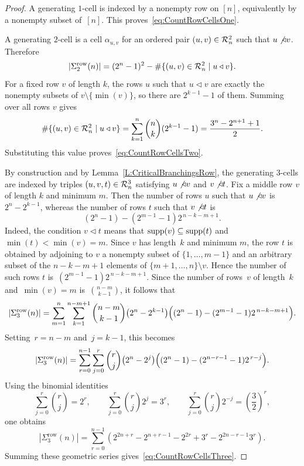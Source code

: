 \documentclass[a4paper, twoside, 11pt, english]{article}
\begin{document}
\begin{proof}
A generating $1$-cell is indexed by a nonempty row on $[n]$, equivalently by a nonempty
subset of~$[n]$. This proves~\eqref{eq:CountRowCellsOne}.

A generating $2$-cell is a cell $\alpha_{u,v}$ for an ordered pair $(u,v)\in \mathcal{R}_n^2$
such that $u\not\triangleleft v$. Therefore
\[
|\Sigma^{\mathrm{row}}_2(n)|
=
(2^n-1)^2-\#\{(u,v)\in \mathcal{R}_n^2\mid u\triangleleft v\}.
\]
For a fixed row $v$ of length $k$, the rows $u$ such that $u\triangleleft v$ are exactly
the nonempty subsets of $v\setminus\{\min(v)\}$, so there are $2^{k-1}-1$ of them.
Summing over all rows $v$ gives
\[
\#\{(u,v)\in \mathcal{R}_n^2\mid u\triangleleft v\}
=
\sum_{k=1}^n \binom{n}{k}(2^{k-1}-1)
=
\frac{3^n-2^{n+1}+1}{2}.
\]
Substituting this value proves~\eqref{eq:CountRowCellsTwo}.


By construction and by Lemma~\ref{L:CriticalBranchingsRow}, the generating
$3$-cells are indexed by triples $(u,v,t)\in \mathcal{R}_n^3$ satisfying $u\not\triangleleft v$ and $v\not\triangleleft t$.
Fix a middle row $v$ of length $k$ and minimum $m$. Then the number of rows $u$ such that
$u\not\triangleleft v$ is~$2^n-2^{k-1}$,
whereas the number of rows $t$ such that $v\not\triangleleft t$ is
\[
(2^n-1)-(2^{m-1}-1)2^{\,n-k-m+1}.
\]
Indeed, the condition $v\triangleleft t$ means that $\operatorname{supp}(v)\subseteq \operatorname{supp}(t)$ and
$\min(t)<\min(v)=m$. Since $v$ has length~$k$ and minimum $m$, the row $t$
is obtained by adjoining to $v$ a nonempty subset of $\{1,\dots,m-1\}$ and
an arbitrary subset of the $n-k-m+1$ elements of $\{m+1,\dots,n\}\setminus v$.
Hence the number of such rows $t$ is~$\displaystyle (2^{m-1}-1)2^{\,n-k-m+1}$.
Since the number of rows~$v$ of length~$k$ and~$\min(v)=m$ is~$\displaystyle \binom{n-m}{k-1}$,
it follows that
\[
|\Sigma^{\mathrm{row}}_3(n)|
=
\sum_{m=1}^n \sum_{k=1}^{n-m+1}
\binom{n-m}{k-1}
\bigl(2^n-2^{k-1}\bigr)
\Bigl((2^n-1)-(2^{m-1}-1)2^{\,n-k-m+1}\Bigr).
\]
Setting~$r=n-m$ and~$j=k-1$, this becomes
\[
|\Sigma^{\mathrm{row}}_3(n)|
=
\sum_{r=0}^{n-1}\sum_{j=0}^r
\binom{r}{j}
\bigl(2^n-2^j\bigr)
\Bigl((2^n-1)-(2^{n-r-1}-1)2^{\,r-j}\Bigr).
\]
Using the binomial identities
\[
\sum_{j=0}^r \binom{r}{j}=2^r,
\qquad
\sum_{j=0}^r \binom{r}{j}2^j=3^r,
\qquad
\sum_{j=0}^r \binom{r}{j}2^{-j}=\left(\frac32\right)^r,
\]
one obtains
\[
|\Sigma^{\mathrm{row}}_3(n)|
=
\sum_{r=0}^{n-1}
\left(
2^{2n+r}-2^{n+r-1}-2^{2r}+3^r-2^{2n-r-1}3^r
\right).
\]
Summing these geometric series gives~\eqref{eq:CountRowCellsThree}.
\end{proof}
\end{document}
